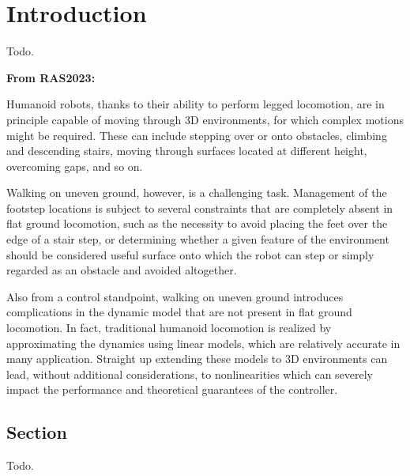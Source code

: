 \chapter{Introduction}
Todo.

\textbf{From RAS2023:}

Humanoid robots, thanks to their ability to perform legged locomotion,
are in principle capable of moving through 3D environments, for which complex
motions might be required. These can include stepping over or onto obstacles,
climbing and descending stairs, moving through surfaces located at different
height, overcoming gaps, and so on.

Walking on uneven ground, however, is a challenging task. Management of the
footstep locations is subject to several constraints that are completely absent
in flat ground locomotion, such as the necessity to avoid placing the feet over
the edge of a stair step, or determining whether a given feature of the
environment should be considered useful surface onto which the robot can
step or simply regarded as an obstacle and avoided altogether.

Also from a control standpoint, walking on uneven ground introduces
complications in the dynamic model that are not present in flat ground
locomotion. In fact, traditional humanoid locomotion is realized by
approximating the dynamics using linear models, which are relatively accurate
in many application. Straight up extending these models to 3D environments can
lead, without additional considerations, to nonlinearities which can severely
impact the performance and theoretical guarantees of the controller.


\section{Section}
Todo.
